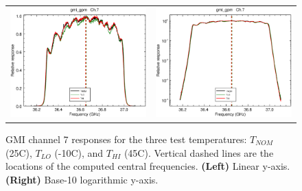 \begin{figure}[htp]
  \centering
  \begin{tabular}{c c}
    \includegraphics[scale=0.3]{graphics/lin/gmi_gpm-7.eps} &
    \includegraphics[scale=0.3]{graphics/log/gmi_gpm-7.eps}
  \end{tabular}
  \caption{GMI channel 7 responses for the three test temperatures: $T_{NOM}$ (25\textdegree{}C), $T_{LO}$ (-10\textdegree{}C), and $T_{HI}$ (45\textdegree{}C). Vertical dashed lines are the locations of the computed central frequencies. \textbf{(Left)} Linear y-axis. \textbf{(Right)} Base-10 logarithmic y-axis.}
  \label{fig:ch7_response}
\end{figure}

